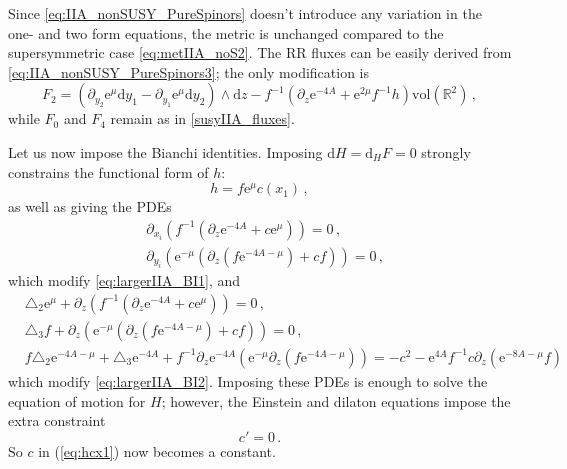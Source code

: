 \documentclass[12pt]{article}
\newcommand{\R}{\mathbb{R}}
\newcommand{\dd}{\mathrm{d}}
\newcommand{\e}{\mathrm{e}}
\newcommand{\vol}{\mathrm{vol}}
\begin{document}
Since \eqref{eq:IIA_nonSUSY_PureSpinors} doesn't introduce any variation in the one- and two form equations, the metric is unchanged compared to the supersymmetric case \eqref{eq:metIIA_noS2}. The RR fluxes can be easily derived from \eqref{eq:IIA_nonSUSY_PureSpinors3}; the only modification is
\begin{equation}
F_2 = \left( \partial_{y_2}\e^{\mu} \dd y_1 -\partial_{y_1}\e^{\mu} \dd y_2 \right) \wedge \dd z - f^{-1}\left( \partial_z \e^{-4A} + \e^{2 \mu} f^{-1} h \right) \vol(\R^2) \, ,
\end{equation}
while $F_0$ and $F_4$ remain as in \eqref{susyIIA_fluxes}.

Let us now impose the Bianchi identities. Imposing $\dd H = \dd_H F = 0$ strongly constrains the functional form of $h$:
\begin{equation}\label{eq:hcx1}
h = f \e^{\mu} c(x_1) \,, 
\end{equation}
as well as giving the PDEs 
\begin{subequations}\label{eq:larger-sb-PDE1}
	\begin{align}
	&\partial_{x_i} \left( f^{-1} \left(\partial_z \e^{-4A} + c \e^\mu \right) \right) =0 \, , \\
	&\partial_{y_i} \left(\e^{-\mu} \left(\partial_{z} (f \e^{-4A-\mu})+c f \right)\right) =0 \, ,
	\end{align}
\end{subequations}
which modify \eqref{eq:largerIIA_BI1}, and
\begin{subequations}\label{eq:larger-sb-PDE2}
	\begin{align}
	&\triangle_2 \e^{\mu} +\partial_{z} \left( f^{-1} \left(\partial_z \e^{-4A} + c \e^\mu \right) \right) =0 \, , \\
	&\triangle_3 f + \partial_z \left(\e^{-\mu} \left(\partial_{z} (f \e^{-4A-\mu})+c f \right) \right) = 0 \, , \\
	&f \triangle_2 \e^{-4A-\mu} + \triangle_3 \e^{-4A} + f^{-1} \partial_{z}\e^{-4A}  \left(\e^{-\mu} \partial_{z} (f \e^{-4A-\mu}) \right) = -c^2 - \e^{4A} f^{-1} c \partial_{z} \left(\e^{-8A-\mu} f\right) \, \label{eq:lastBI_IIA_gen}
	\end{align}
\end{subequations}
which modify \eqref{eq:largerIIA_BI2}. Imposing these PDEs is enough to solve the equation of motion for $H$; however, the Einstein and dilaton equations impose the extra constraint
\begin{equation}\label{eq:hcx2}
	c'=0\,.
\end{equation}
So $c$ in (\ref{eq:hcx1}) now becomes a constant.
\end{document}

